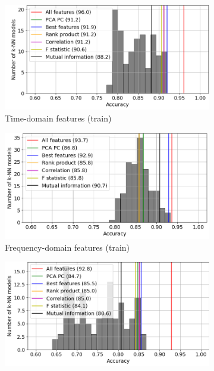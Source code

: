 \begin{figure}[h]
    \centering
    \begin{subfigure}[b]{0.48\textwidth}
        \includegraphics[width=\textwidth]{assets/results/feature-combinations/model-distr-fsel-k5-f3-TD-train.png}
        \caption{Time-domain features (train)}
    \end{subfigure}
    \hfill
    \begin{subfigure}[b]{0.48\textwidth}
        \includegraphics[width=\textwidth]{assets/results/feature-combinations/model-distr-fsel-k5-f3-FD-train.png}
        \caption{Frequency-domain features (train)}
    \end{subfigure}
    \hfill
    \begin{subfigure}[b]{0.48\textwidth}
        \includegraphics[width=\textwidth]{assets/results/feature-combinations/model-distr-fsel-k5-f3-TD-test.png}

\end{subfigure}
\end{figure}
